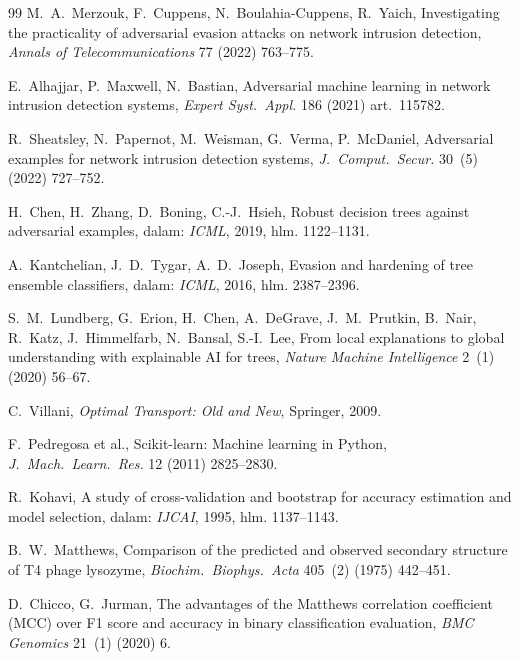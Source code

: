 \documentclass[11pt,a4paper]{article}
\begin{document}
\begin{thebibliography}{99}
 M.~A.~Merzouk, F.~Cuppens, N.~Boulahia-Cuppens, R.~Yaich,
Investigating the practicality of adversarial evasion attacks on network intrusion
detection, \emph{Annals of Telecommunications} 77 (2022) 763--775.

 E.~Alhajjar, P.~Maxwell, N.~Bastian, Adversarial machine
learning in network intrusion detection systems, \emph{Expert Syst.\ Appl.} 186
(2021) art.~115782.

 R.~Sheatsley, N.~Papernot, M.~Weisman, G.~Verma,
P.~McDaniel, Adversarial examples for network intrusion detection systems,
\emph{J.\ Comput.\ Secur.} 30~(5) (2022) 727--752.

 H.~Chen, H.~Zhang, D.~Boning, C.-J.~Hsieh, Robust
decision trees against adversarial examples, dalam: \emph{ICML}, 2019, hlm.
1122--1131.

 A.~Kantchelian, J.~D.~Tygar, A.~D.~Joseph, Evasion and
hardening of tree ensemble classifiers, dalam: \emph{ICML}, 2016, hlm. 2387--2396.

 S.~M.~Lundberg, G.~Erion, H.~Chen, A.~DeGrave,
J.~M.~Prutkin, B.~Nair, R.~Katz, J.~Himmelfarb, N.~Bansal, S.-I.~Lee, From local
explanations to global understanding with explainable AI for trees, \emph{Nature
Machine Intelligence} 2~(1) (2020) 56--67.

 C.~Villani, \emph{Optimal Transport: Old and New}, Springer,
2009.

 F.~Pedregosa et al., Scikit-learn: Machine learning in Python,
\emph{J.\ Mach.\ Learn.\ Res.} 12 (2011) 2825--2830.

 R.~Kohavi, A study of cross-validation and bootstrap for accuracy
estimation and model selection, dalam: \emph{IJCAI}, 1995, hlm. 1137--1143.

 B.~W.~Matthews, Comparison of the predicted and observed
secondary structure of T4 phage lysozyme, \emph{Biochim.\ Biophys.\ Acta} 405~(2)
(1975) 442--451.

 D.~Chicco, G.~Jurman, The advantages of the Matthews correlation
coefficient (MCC) over F1 score and accuracy in binary classification evaluation,
\emph{BMC Genomics} 21~(1) (2020) 6.

\end{thebibliography}
\end{document}
